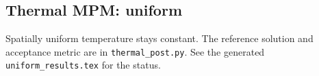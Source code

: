 \subsection{Thermal MPM: uniform}
Spatially uniform temperature stays constant. The reference solution and acceptance metric are in \texttt{thermal\_post.py}. See the generated \texttt{uniform\_results.tex} for the status.
